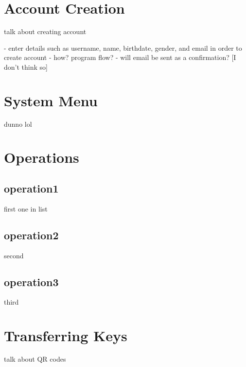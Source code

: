\section{Account Creation}
talk about creating account

- enter details such as username, name, birthdate, gender, and email in order to create account
- how? program flow?
- will email be sent as a confirmation? [I don't think so]

\section{System Menu}
dunno lol
\section{Operations}
\subsection{operation1}
first one in list
\subsection{operation2}
second
\subsection{operation3}
third
\section{Transferring Keys}
talk about QR codes